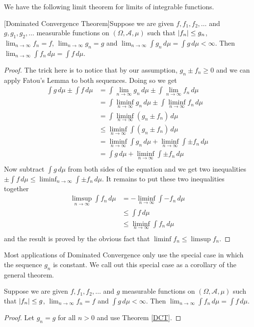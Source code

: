 We have the following limit theorem for limits of integrable
functions.
\begin{thm}\label{DCT}[Dominated Convergence Theorem]Suppose we are given $f, f_1, f_2, \dots$ and $g,g_1,g_2,
  \dots$ measurable functions on $(\Omega,
  \mathcal{A}, \mu)$ such that $\left \vert f_n \right \vert \leq g_n$, $\lim_{n \to
    \infty} f_n = f$, $\lim_{n \to
    \infty} g_n = g$ and $\lim_{n \to \infty} \int g_n \, d \mu  =
  \int g \, d \mu < \infty$.  Then $\lim_{n \to \infty} \int f_n \,
  d\mu = \int f \, d\mu$.
\end{thm}
\begin{proof}The trick here is to notice that by our assumption, $g_n
  \pm f_n \geq 0$ and we can apply Fatou's Lemma to both sequences.
  Doing so we get
\begin{align*}
\int g \, d\mu \pm \int f \, d\mu &= \int \lim_{n \to \infty} g_n \,
d\mu \pm \int \lim_{n \to \infty}  f_n \, d\mu \\
&=\int \liminf_{n \to \infty} g_n \,
d\mu \pm \int \liminf_{n \to \infty}  f_n \, d\mu \\
&=\int \liminf_{n \to \infty} \left (g_n  \pm  f_n \right ) \, d\mu \\
&\leq \liminf_{n \to \infty} \int \left (g_n  \pm  f_n \right ) \, d\mu \\
&= \liminf_{n \to \infty} \int g_n \, d\mu + \liminf_{n \to \infty} \int \pm  f_n  \, d\mu \\
&= \int g \, d\mu + \liminf_{n \to \infty} \int \pm  f_n  \, d\mu \\
\end{align*}
Now subtract $\int g \, d\mu$ from both sides of the equation and we
get two inequalities $\pm \int f \, d\mu \leq \liminf_{n \to \infty}
\int \pm  f_n  \, d\mu $.  It remains to put these two inequalities
together 
\begin{align*}
\limsup_{n \to \infty} \int f_n \, d\mu &= -\liminf_{n \to \infty}
\int -f_n \, d\mu \\
&\leq \int f \, d\mu \\
&\leq \liminf_{n \to \infty} \int f_n \, d\mu \\
\end{align*}
and the result is proved by the
obvious fact that $\liminf f_n \leq \limsup f_n$.
\end{proof}
Most applications of Dominated Convergence only use the special case in
which the sequence $g_n$ is constant.  We call out this special case
as a corollary of the general theorem.
\begin{cor}Suppose we are given $f, f_1, f_2, \dots$ and $g$ measurable functions on $(\Omega,
  \mathcal{A}, \mu)$ such that $\left \vert f_n \right \vert \leq g$, $\lim_{n \to
    \infty} f_n = f$ and $\int g \, d \mu < \infty$.  Then $\lim_{n \to \infty} \int f_n \,
  d\mu = \int f \, d\mu$.
\end{cor}
\begin{proof}Let $g_n = g$ for all $n>0$ and use Theorem \ref{DCT}.
\end{proof}

